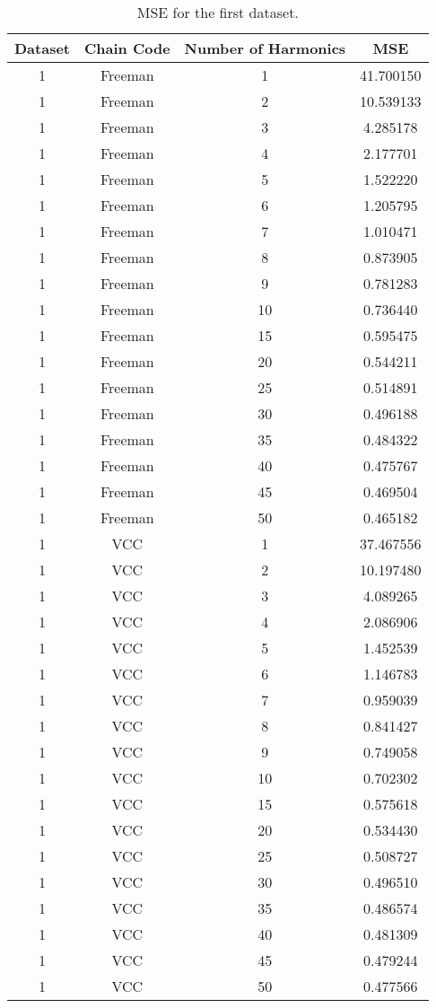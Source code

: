 \documentclass[thesis.tex]{subfiles}
\begin{document}
\begin{table}
\centering
 \begin{tabular}{c c c c} 
 \toprule
 Dataset &  Chain Code & Number of Harmonics & MSE\\ [0.5ex] 
 \midrule
1 & Freeman & 1  & 41.700150 \\
1 & Freeman & 2  & 10.539133 \\
1 & Freeman & 3  & 4.285178  \\
1 & Freeman & 4  & 2.177701  \\
1 & Freeman & 5  & 1.522220  \\
1 & Freeman & 6  & 1.205795  \\
1 & Freeman & 7  & 1.010471  \\
1 & Freeman & 8  & 0.873905  \\
1 & Freeman & 9  & 0.781283  \\
1 & Freeman & 10 & 0.736440  \\
1 & Freeman & 15 & 0.595475  \\
1 & Freeman & 20 & 0.544211  \\
1 & Freeman & 25 & 0.514891  \\
1 & Freeman & 30 & 0.496188  \\
1 & Freeman & 35 & 0.484322  \\
1 & Freeman & 40 & 0.475767  \\
1 & Freeman & 45 & 0.469504  \\
1 & Freeman & 50 & 0.465182  \\
1 & VCC & 1  & 37.467556 \\
1 & VCC & 2  & 10.197480 \\
1 & VCC & 3  & 4.089265  \\
1 & VCC & 4  & 2.086906  \\
1 & VCC & 5  & 1.452539  \\
1 & VCC & 6  & 1.146783  \\
1 & VCC & 7  & 0.959039  \\
1 & VCC & 8  & 0.841427  \\
1 & VCC & 9  & 0.749058  \\
1 & VCC & 10 & 0.702302  \\
1 & VCC & 15 & 0.575618  \\
1 & VCC & 20 & 0.534430  \\
1 & VCC & 25 & 0.508727  \\
1 & VCC & 30 & 0.496510  \\
1 & VCC & 35 & 0.486574  \\
1 & VCC & 40 & 0.481309  \\
1 & VCC & 45 & 0.479244  \\
1 & VCC & 50 & 0.477566  \\
\bottomrule
\end{tabular}
\caption{MSE for the first dataset.}
\label{mse_1}
\end{table}
\end{document}
